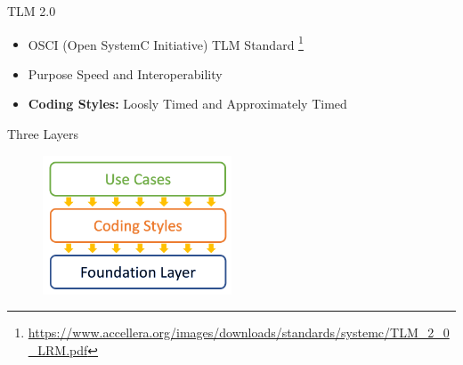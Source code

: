 \begin{frame}{TLM 2.0}
	\begin{itemize}
		\item OSCI (Open SystemC Initiative) TLM Standard \footnote{\url{https://www.accellera.org/images/downloads/standards/systemc/TLM_2_0_LRM.pdf}}
		\item Purpose Speed and Interoperability
		\item \textbf{Coding Styles:} Loosly Timed and Approximately Timed
	\end{itemize}
\begin{block}{Three Layers}
\begin{figure}
\label{fig:tlm2}
\centering
\includegraphics[width=0.5\textwidth]{pictures/Layers.PNG}
\end{figure}
\end{block}
\end{frame}

